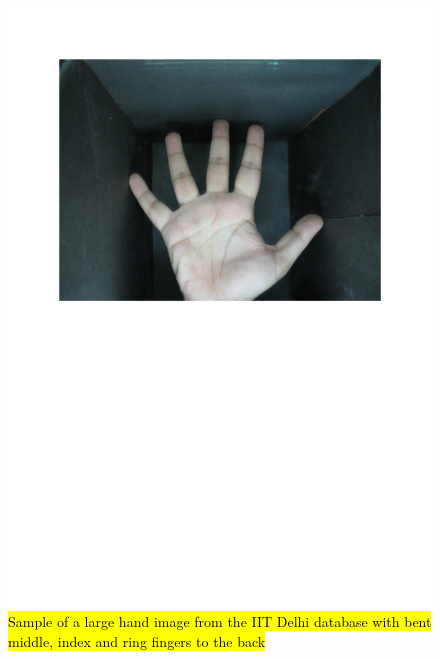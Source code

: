 \documentclass[review]{elsarticle}
\begin{document}
		\begin{figure}[!h]
			\centering
			\includegraphics[page=5,scale=.57,trim=1cm 14.7cm 1cm 1.7cm,clip]{IIT_problematic.pdf}
			\caption{\hl{Sample of a large hand image from the IIT Delhi database with bent middle, index and ring fingers to the back}}
			\label{fig:IIT_problematic_hand4}
		\end{figure}
\end{document}
